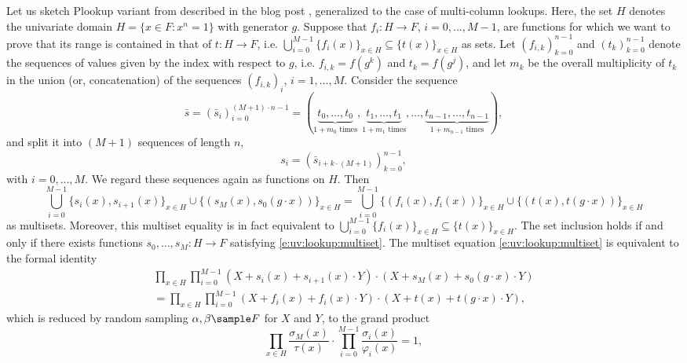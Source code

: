\documentclass[11pt]{article}
\theoremstyle{definition}
\theoremstyle{remark}
\begin{document}
Let us sketch Plookup variant from \cite{Plookup} described in the blog post \cite{LookupsBlog}, generalized to the case of multi-column lookups.
Here, the set $H$ denotes the univariate domain $H = \{x\in F: x^n = 1\}$ with generator $g$.
Suppose that $f_i:H\rightarrow F$, $i=0, \ldots, M-1$,  are functions for which we want to prove that its range is contained in that of $t: H\rightarrow F$, i.e. $\bigcup_{i=0}^{M-1} \{f_i(x)\}_{x\in H}\subseteq \{t(x)\}_{x\in H}$ as sets.
Let $(f_{i,k})_{k = 0}^{n-1}$ and $(t_k)_{k=0}^{n-1}$ denote the sequences  of values given by the index with respect to $g$, i.e. $f_{i,k}= f(g^k)$ and $t_k=f(g^j)$, and let $m_k$ be the overall multiplicity of $t_k$ in the union (or, concatenation) of the sequences $(f_{i,k})_i$, $i=1,\ldots, M$.
Consider the sequence
\[
\bar s = (\bar s_i)_{i=0}^{(M + 1)\cdot n - 1} = (\underbrace{t_0, \ldots, t_0}_{1 + m_0 \text{ times}}, \underbrace{t_1, \ldots, t_1}_{1 + m_1 \text{ times}}, \ldots, \underbrace{t_{n-1}, \ldots, t_{n-1}}_{1 + m_{n-1} \text{ times}}),
\]
and split it into $(M+1)$ sequences of length $n$,  
\[
s_i = (\bar s_{i + k\cdot (M+1)})_{k = 0}^{n-1},
\] 
with $i= 0, \ldots, M$.
We regard these sequences again as functions on $H$.
Then
\begin{equation}
\label{e:uv:lookup:multiset}
\bigcup_{i=0}^{M-1} \{s_i(x), s_{i+1}(x) \}_{x\in H} \cup \{(s_M(x), s_0(g\cdot x))\}_{x\in H} = \bigcup_{i=0}^{M-1}\{ (f_i(x), f_i(x))\}_{x\in H} \cup \{(t(x), t(g\cdot x))\}_{x\in H}
\end{equation}
as multisets.
Moreover, this multiset equality is in fact equivalent to $\bigcup_{i=0}^{M-1}\{f_i(x)\}_{x\in H}\subseteq \{t(x)\}_{x\in H}$.
The set inclusion holds if and only if there exists functions $s_0,\ldots, s_M: H\rightarrow F$ satisfying \eqref{e:uv:lookup:multiset}. %
The multiset equation \eqref{e:uv:lookup:multiset} is equivalent to the formal identity
\begin{multline*}
\prod_{x\in H} \prod_{i=0}^{M-1} (X + s_i(x) + s_{i+1}(x)\cdot Y)\cdot (X + s_M(x) + s_0(g\cdot x)\cdot Y) 
\\
= \prod_{x\in H} \prod_{i=0}^{M-1} (X + f_i(x) + f_i(x)\cdot Y)\cdot (X + t(x) + t(g\cdot x)\cdot Y),
\end{multline*}
which is reduced by random sampling $\alpha, \beta\sample F$ for $X$ and $Y$, to the grand product
\begin{equation}
\label{e:UV:lookup:q}
\prod_{x\in H}  \frac{\sigma_{M}(x)}{\tau(x)}\cdot \prod_{i=0}^{M-1} \frac{\sigma_{i}(x)}{\varphi_{i}(x)}   = 1,
\end{equation}
\end{document}
